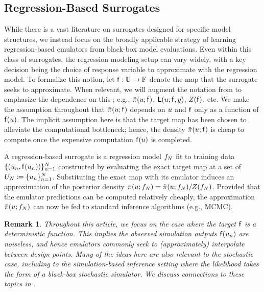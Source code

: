 \documentclass[12pt]{article}
\newtheorem{remark}{Remark}
\begin{document}
\subsection{Regression-Based Surrogates}
While there is a vast literature on surrogates designed for specific model structures, 
we instead focus on the broadly applicable strategy of learning regression-based emulators from black-box model 
evaluations. Even within this class of surrogates, the regression modeling setup can vary widely, 
with a key decision being the choice of response variable to approximate with the regression model. 
To formalize this notion, let $\mathsf{f}: \mathbb{U} \to \mathbb{F}$ denote the map that the surrogate seeks to 
approximate. When relevant, we will augment the notation from  to emphasize the dependence
on this ; e.g., $\tilde{\pi}(u; \mathsf{f})$, $\mathsf{L}(u; \mathsf{f}, y)$, $Z(\mathsf{f})$, etc. 
We make the assumption throughout that $\tilde{\pi}(u; \mathsf{f})$ depends on $u$ and $\mathsf{f}$ only as a 
function of $\mathsf{f}(u)$.
The implicit assumption here is that the target map has been chosen to alleviate the computational bottleneck; hence,
the density $\tilde{\pi}(u; \mathsf{f})$ is cheap to compute once the expensive computation $\mathsf{f}(u)$ is 
completed.

A regression-based surrogate is a regression model $f_{N}$ fit to training data 
$\{(u_{n}, \mathsf{f}(u_{n}))\}_{n=1}^{N}$ constructed by evaluating the exact
target map at a set of  $U_{N} \coloneqq \{u_{n}\}_{n=1}^{N}$.
Substituting the exact map with its emulator induces an approximation of the posterior density 
$\pi(u; f_{N}) = \tilde{\pi}(u; f_{N}) / Z(f_{N})$. Provided that the 
emulator predictions can be computed relatively cheaply, the approximation $\tilde{\pi}(u; f_{N})$
can now be fed to standard inference algorithms (e.g., MCMC).

\begin{remark}
Throughout this article, we focus on the case where the target $\mathsf{f}$ is a deterministic function.
This implies the observed simulation outputs $\mathsf{f}(u_{n})$ are noiseless, and hence 
emulators commonly seek to (approximately) interpolate between design points.
Many of the ideas here are also relevant to the stochastic case, including to the simulation-based
inference setting where the likelihood takes the form of a black-box stochastic simulator. We discuss
connections to these topics in .
\end{remark}
\end{document}
